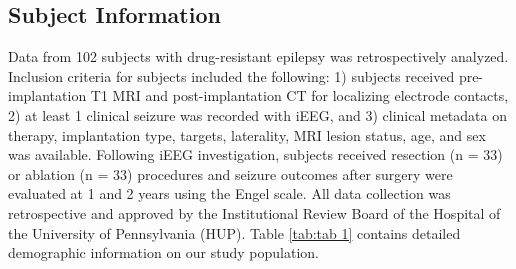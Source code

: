 \documentclass[11pt]{article}
\begin{document}
\subsection*{Subject Information}
Data from 102 subjects with drug-resistant epilepsy was retrospectively analyzed. Inclusion criteria for subjects included the following: 1) subjects received pre-implantation T1 MRI and post-implantation CT for localizing electrode contacts, 2) at least 1 clinical seizure was recorded with iEEG, and 3) clinical metadata on therapy, implantation type, targets, laterality, MRI lesion status, age, and sex was available. Following iEEG investigation, subjects received resection (n = 33) or ablation (n = 33) procedures and seizure outcomes after surgery were evaluated at 1 and 2 years using the Engel scale\cite{Vakharia2018Getting}. All data collection was retrospective and approved by the Institutional Review Board of the Hospital of the University of Pennsylvania (HUP). Table \ref{tab:tab 1} contains detailed demographic information on our study population.
\end{document}
